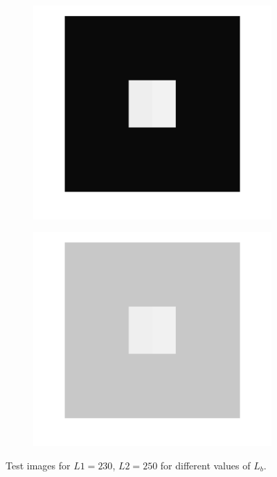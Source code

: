 \documentclass{article}
\begin{document}
\begin{figure}
    \centering
    \begin{subfigure}[c]{0.4\textwidth}
        \includegraphics[width=\textwidth]{images/weber_10.png}
    \end{subfigure}
    \begin{subfigure}[c]{0.4\textwidth}
        \includegraphics[width=\textwidth]{images/weber_200.png}
    \end{subfigure}
    \caption{Test images for $L1=230$, $L2=250$ for different values of $L_b$.}
    \label{fig:weber}
\end{figure}
\end{document}
